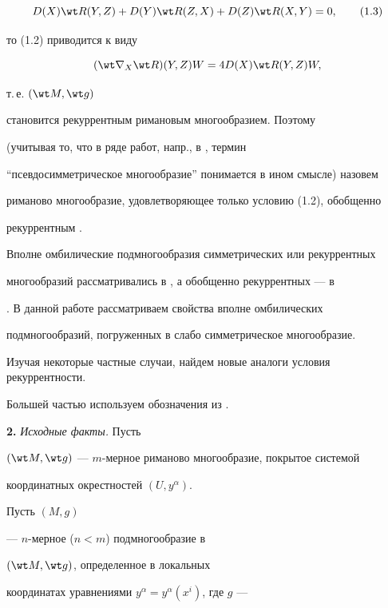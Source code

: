 \begin{equation}


D(X)\wt R(Y,Z)+D(Y)\wt R(Z,X)+D(Z)\wt R(X,Y)=0,\tag{1.3}


\end{equation}


то (1.2) приводится к виду


$$


(\wt\nabla_X\wt R)(Y,Z)W=4D(X)\wt R(Y,Z)W,


$$


т.\,е. $(\wt M,\wt g)$


становится рекуррентным римановым многообразием. Поэтому


(учитывая то, что в ряде работ, напр., в \cite{4}, термин


``псевдосимметрическое многообразие'' понимается в ином смысле) назовем


риманово многообразие, удовлетворяющее только условию (1.2), обобщенно


рекуррентным \cite{9}.





Вполне омбилические подмногообразия симметрических или рекуррентных


многообразий рассматривались в \cite{7}, а обобщенно рекуррентных --- в


\cite{6}. В данной работе рассматриваем свойства вполне омбилических


подмногообразий, погруженных в слабо симметрическое многообразие.


Изучая некоторые частные случаи, найдем новые аналоги условия рекуррентности.





Большей частью используем обозначения из \cite{7}.





{\bf 2.} {\it Исходные факты.} Пусть


$(\wt M,\wt g)$ --- $m$-мерное риманово многообразие, покрытое системой


координатных окрестностей $(U,y^\alpha)$.


Пусть $(M,g)$


--- $n$-мерное ($n<m$) подмногообразие в


$(\wt M,\wt g)$, определенное в локальных


координатах уравнениями $y^\alpha=y^\alpha(x^i)$, где $g$ ---


